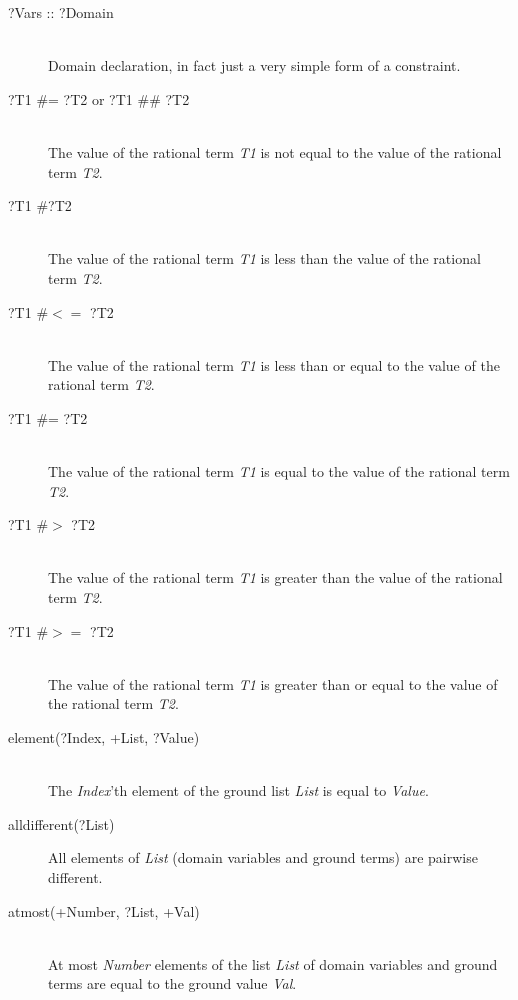 \begin{description}
\item[?Vars :: ?Domain]\ \\
Domain declaration, in fact just a very simple form of a constraint.

\item[?T1 \#\bsl= ?T2 or ?T1 \#\# ?T2]\ \\
The value of the rational term {\it T1} is not equal to the value of the
rational term {\it T2}.

\item[?T1 \#\lt ?T2]\ \\
The value of the rational term {\it T1} is less than the value of the
rational term {\it T2}.

\item[?T1 \#$<=$ ?T2]\ \\
The value of the rational term {\it T1} is less than or equal to the value of the
rational term {\it T2}.

\item[?T1 \#= ?T2]\ \\
The value of the rational term {\it T1} is equal to the
value of the rational term {\it T2}.

\item[?T1 \#$>$ ?T2]\ \\
The value of the rational term {\it T1} is greater than the
value of the rational term {\it T2}.

\item[?T1 \#$>=$ ?T2]\ \\
The value of the rational term {\it T1} is greater than or equal to the
value of the rational term {\it T2}.

\item[element(?Index, +List, ?Value)]\ \\
The {\it Index}'th element of the ground list {\it List}
is equal to {\it Value}.

\item[alldifferent(?List)]
All elements of {\it List} (domain variables and ground terms) are pairwise
different.

\item[atmost(+Number, ?List, +Val)]\ \\
At most {\it Number} elements of the list {\it List} of domain variables
and ground terms are equal to the ground value {\it Val}.
\end{description}


